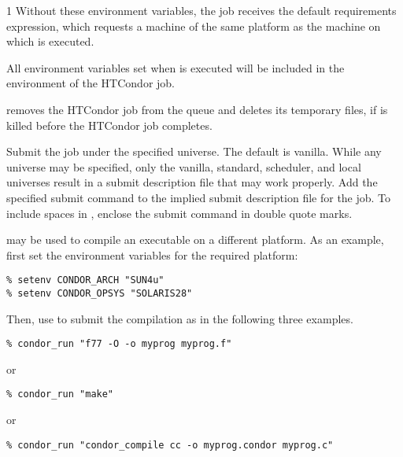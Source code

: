 \begin{ManPage}{\label{man-condor-run}}{1}
Without these environment variables, 
the job receives the default requirements expression, which
requests a machine of the same platform as
the machine on which  is executed.

All environment variables set when  is executed will be
included in the environment of the HTCondor job.

 removes the HTCondor job from the queue and
deletes its temporary files, if  is killed before the 
HTCondor job completes.

\begin{Options}

  {Submit the job under the specified universe. The default is vanilla.
  While any universe may be specified, only the vanilla, standard,
  scheduler, and local universes result in a submit description
  file that may work properly.}
  {Add the specified submit command to the implied submit description file
  for the job. To include spaces in ,
  enclose the submit command in double quote marks. }

\end{Options}

\Examples

 may be used to compile an executable on
a different platform.
As an example, first set the environment variables for
the required platform:

\begin{verbatim}
% setenv CONDOR_ARCH "SUN4u"
% setenv CONDOR_OPSYS "SOLARIS28"
\end{verbatim}

Then, use  to submit the compilation as in the
following three examples.
\begin{verbatim}
% condor_run "f77 -O -o myprog myprog.f"
\end{verbatim}
or
\begin{verbatim}
% condor_run "make"
\end{verbatim}
or
\begin{verbatim}
% condor_run "condor_compile cc -o myprog.condor myprog.c"
\end{verbatim}


\Files


\end{ManPage}
